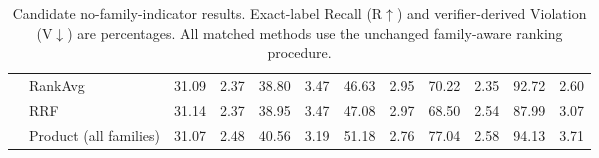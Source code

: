 \begin{table}[t]
{\begin{tabular}{@{}llrrrrrrrrrr@{}}
& RankAvg & 31.09 & 2.37 & 38.80 & 3.47 & 46.63 & 2.95 & 70.22 & 2.35 & 92.72 & 2.60 \\
& RRF & 31.14 & 2.37 & 38.95 & 3.47 & 47.08 & 2.97 & 68.50 & 2.54 & 87.99 & 3.07 \\
& Product (all families) & 31.07 & 2.48 & 40.56 & 3.19 & 51.18 & 2.76 & 77.04 & 2.58 & 94.13 & 3.71 \\
\bottomrule
\end{tabular}
}
\caption{Candidate no-family-indicator results. Exact-label Recall (R$\uparrow$) and verifier-derived Violation (V$\downarrow$) are percentages. All matched methods use the unchanged family-aware ranking procedure.}
\label{tab:no-family-main}
\end{table}
